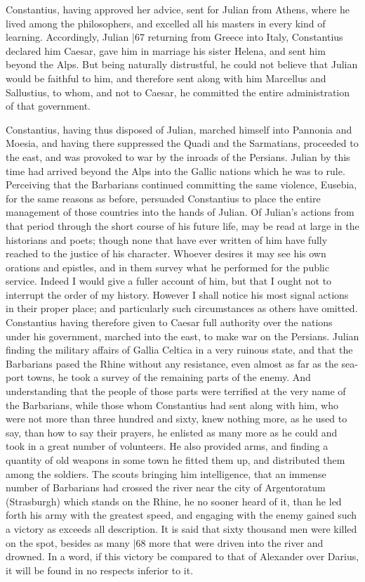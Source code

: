 Constantius, having approved her advice, sent for Julian from Athens, where he lived among the philosophers, and excelled all his masters in every kind of learning. Accordingly, Julian
|67 returning from Greece into Italy, Constantius declared him Caesar, gave him in marriage his sister Helena, and sent him beyond the Alps. But being naturally distrustful, he could not believe that Julian would be faithful to him, and therefore sent along with him Marcellus and Sallustius, to whom, and not to Caesar, he committed the entire administration of that government.

Constantius, having thus disposed of Julian, marched himself into Pannonia and Moesia, and having there suppressed the Quadi and the Sarmatians, proceeded to the east, and was provoked to war by the inroads of the Persians. Julian by this time had arrived beyond the Alps into the Gallic nations which he was to rule. Perceiving that the Barbarians continued committing the same violence, Eusebia, for the same reasons as before, persuaded Constantius to place the entire management of those countries into the hands of Julian. Of Julian's actions from that period through the short course of his future life, may be read at large in the historians and poets; though none that have ever written of him have fully reached to the justice of his character. Whoever desires it may see his own orations and epistles, and in them survey what he performed for the public service. Indeed I would give a fuller account of him, but that I ought not to interrupt the order of my history. However I shall notice his most signal actions in their proper place; and particularly such circumstances as others have omitted. Constantius having therefore given to Caesar full authority over the nations under his government, marched into the east, to make war on the Persians. Julian finding the military affairs of Gallia Celtica in a very ruinous state, and that the Barbarians pased the Rhine without any resistance, even almost as far as the sea-port towns, he took a survey of the remaining parts of the enemy. And understanding that the people of those parts were terrified at the very name of the Barbarians, while those whom Constantius had sent along with him, who were not more than three hundred and sixty, knew nothing more, as he used to say, than how to say their prayers, he enlisted as many more as he could and took in a great number of volunteers. He also provided arms, and finding a quantity of old weapons in some town he fitted them up, and distributed them among the soldiers. The scouts bringing him intelligence, that an immense number of Barbarians had crossed the river near the city of Argentoratum (Strasburgh) which stands on the Rhine, he no sooner heard of it, than he led forth his army with the greatest speed, and engaging with the enemy gained such a victory as exceeds all description. It is said that sixty thousand men were killed on the spot, besides as many
|68 more that were driven into the river and drowned. In a word, if this victory be compared to that of Alexander over Darius, it will be found in no respects inferior to it.

